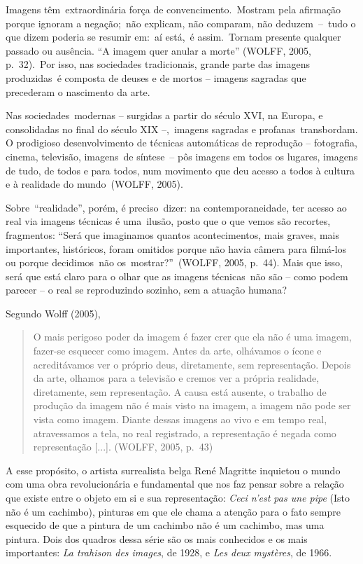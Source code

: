 \documentclass[
  letterpaper,
]{abntex2}
\begin{document}
Imagens têm~extraordinária força de convencimento.~Mostram pela
afirmação porque ignoram a negação;~não explicam, não comparam, não
deduzem~--~tudo o que dizem poderia se resumir em:~aí está,~é
assim.~Tornam presente qualquer passado ou ausência. ``A imagem quer
anular a morte'' (WOLFF, 2005, p.~32).~Por isso, nas sociedades
tradicionais, grande parte das imagens produzidas~é composta de deuses e
de mortos -- imagens sagradas que precederam o nascimento da arte.~

Nas sociedades~modernas -- surgidas a partir do século XVI, na Europa, e
consolidadas no final do século XIX --,~imagens sagradas e
profanas~transbordam. O prodigioso desenvolvimento de técnicas
automáticas de reprodução -- fotografia, cinema, televisão, imagens~de
síntese~-- pôs imagens em todos os lugares, imagens de tudo, de todos e
para todos, num movimento que deu acesso a todos à cultura e à realidade
do mundo~(WOLFF, 2005).

Sobre~``realidade'', porém, é preciso~dizer: na contemporaneidade, ter
acesso ao real via imagens técnicas é uma~ilusão, posto que o que vemos
são recortes, fragmentos: ``Será que imaginamos quantos acontecimentos,
mais graves, mais importantes, históricos, foram omitidos porque não
havia câmera para filmá-los ou porque decidimos~não
os~mostrar?''~(WOLFF, 2005, p.~44). Mais que isso, será que está claro
para o olhar que as imagens técnicas~não são -- como podem parecer -- o
real se reproduzindo sozinho, sem a atuação humana? ~

Segundo Wolff (2005),~

\begin{quote}
O mais perigoso poder da imagem é fazer crer que ela não é uma imagem,
fazer-se esquecer como imagem. Antes da arte, olhávamos o ícone e
acreditávamos ver o próprio deus, diretamente, sem representação. Depois
da arte, olhamos para a televisão e cremos ver a própria realidade,
diretamente, sem representação. A causa está ausente, o trabalho de
produção da imagem não é mais visto na imagem, a imagem não pode ser
vista como imagem. Diante dessas imagens ao vivo e em tempo real,
atravessamos a tela, no real registrado, a representação é negada como
representação {[}...{]}. (WOLFF, 2005, p.~43)~
\end{quote}

A esse propósito, o artista surrealista belga René Magritte inquietou o
mundo com uma obra revolucionária e fundamental que nos faz pensar sobre
a relação que existe entre o objeto em si e sua representação:
\emph{Ceci n'est pas une pipe} (Isto não é um cachimbo), pinturas em que
ele chama a atenção para o fato sempre esquecido de que a pintura de um
cachimbo não é um cachimbo, mas uma pintura. Dois dos quadros dessa
série são os mais conhecidos e os mais importantes: \emph{La trahison
des images}, de 1928, e \emph{Les deux mystères}, de 1966.
\end{document}
